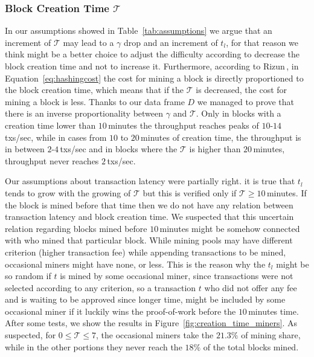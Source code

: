 \documentclass[USenglish]{uit-thesis}
\begin{document}
\subsubsection{Block Creation Time $\mathcal{T}$}
In our assumptions showed in Table~\ref{tab:assumptions} we argue
that an increment of $\mathcal{T}$ may lead to a
$\gamma$ drop and an increment of $t_l$, for that reason we think
might be a better choice to adjust the difficulty according to
decrease the block creation time and not to increase it. Furthermore,
according to Rizun\,\cite{Rizun:2015:blocksizelimit}, in Equation~\ref{eq:hashingcost}
the cost for mining a block is directly proportioned to the block creation
time, which means that if the $\mathcal{T}$ is decreased, the cost for
mining a block is less. Thanks to our data frame $D$ we managed to
prove that there is an inverse proportionality between $\gamma$ and
$\mathcal{T}$. Only in blocks with a creation time lower than $10$\,minutes
the throughput reaches peaks of $10$-$14$\,txs/sec, while in
cases from $10$ to $20$\,minutes of creation
time, the throughput is in between
$2$-$4$\,txs/sec and in blocks where the $\mathcal{T}$ is
higher than $20$\,minutes, throughput never reaches
$2$\,txs/sec.

Our assumptions about transaction latency were partially right.
it is true that $t_l$ tends to grow with the growing
of $\mathcal{T}$ but this is verified
only if $\mathcal{T} \geq 10$\,minutes. If the block is mined
before that time then we do not have any relation between
transaction latency and block creation time.
We suspected that this uncertain relation regarding
blocks mined before $10$\,minutes might be
somehow connected with who mined that particular block.
While mining pools may have different criterion (higher transaction
fee) while appending transactions to be mined,
occasional miners might have none, or less. This is the reason why
the $t_l$ might be so random if $t$ is mined by some occasional miner,
since transactions were not selected
according to any criterion, so a transaction $t$ who did not offer any fee
and is waiting to be approved since longer time, might be included
by some occasional miner if it luckily wins the proof-of-work before
the $10$\,minutes time. After some tests, we show the results in
Figure~\ref{fig:creation_time_miners}. As suspected, for $0 \leq \mathcal{T} \leq 7$,
the occasional miners take the $21.3\%$ of mining share, while in the
other portions they never reach the $18\%$ of the total blocks mined.
\end{document}
